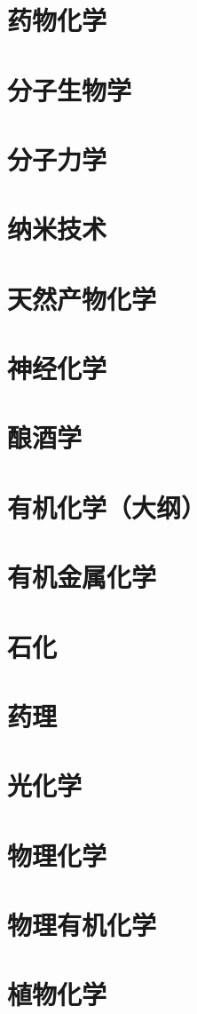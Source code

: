 \documentclass[UTF8]{NatureUniverse}
\begin{document}
\section{药物化学}
\section{分子生物学}
\section{分子力学}
\section{纳米技术}
\section{天然产物化学}
\section{神经化学}
\section{酿酒学}
\section{有机化学（大纲）}
\section{有机金属化学}
\section{石化}
\section{药理}
\section{光化学}
\section{物理化学}
\section{物理有机化学}
\section{植物化学}
\end{document}
